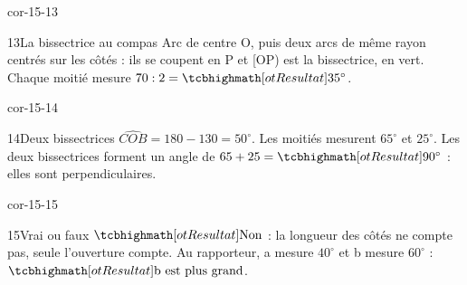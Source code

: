 \begin{blocLivre}{cor-15-13}\begin{corrige}{13}{La bissectrice au compas}
Arc de centre O, puis deux arcs de même rayon centrés sur les côtés : ils se coupent en P et [OP) est la bissectrice, en vert. Chaque moitié mesure $70:2=\res{35^\circ}$.
\label{fig-cor-15-13}
\end{corrige}\end{blocLivre}
\begin{blocLivre}{cor-15-14}\begin{corrige}{14}{Deux bissectrices}
$\widehat{COB}=180-130=50^\circ$. Les moitiés mesurent $65^\circ$ et $25^\circ$. Les deux bissectrices forment un angle de $65+25=\res{90^\circ}$ : elles sont perpendiculaires.
\label{fig-cor-15-14}
\end{corrige}\end{blocLivre}
\begin{blocLivre}{cor-15-15}\begin{corrige}{15}{Vrai ou faux}
$\res{\text{Non}}$ : la longueur des côtés ne compte pas, seule l’ouverture compte. Au rapporteur, a mesure $40^\circ$ et b mesure $60^\circ$ : $\res{\text{b est plus grand}}$.
\label{fig-cor-15-15}
\end{corrige}\end{blocLivre}
